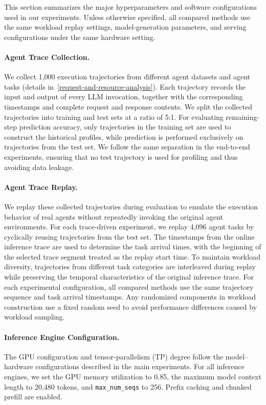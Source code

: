 This section summarizes the major hyperparameters and software configurations used in our experiments. Unless otherwise specified, all compared methods use the same workload replay settings, model-generation parameters, and serving configurations under the same hardware setting.

\paragraph{Agent Trace Collection.}
We collect 1,000 execution trajectories from different agent datasets and agent tasks (details in~\autoref{request-and-resource-analysis}). Each trajectory records the input and output of every LLM invocation, together with the corresponding timestamps and complete request and response contents. We split the collected trajectories into training and test sets at a ratio of 5:1. For evaluating remaining-step prediction accuracy, only trajectories in the training set are used to construct the historical profiles, while prediction is performed exclusively on trajectories from the test set. We follow the same separation in the end-to-end experiments, ensuring that no test trajectory is used for profiling and thus avoiding data leakage.

\paragraph{Agent Trace Replay.}
We replay these collected trajectories during evaluation to emulate the execution behavior of real agents without repeatedly invoking the original agent environments. For each trace-driven experiment, we replay 4,096 agent tasks by cyclically reusing trajectories from the test set. The timestamps from the online inference trace are used to determine the task arrival times, with the beginning of the selected trace segment treated as the replay start time. To maintain workload diversity, trajectories from different task categories are interleaved during replay while preserving the temporal characteristics of the original inference trace. For each experimental configuration, all compared methods use the same trajectory sequence and task arrival timestamps. Any randomized components in workload construction use a fixed random seed to avoid performance differences caused by workload sampling.

\paragraph{Inference Engine Configuration.}
The GPU configuration and tensor-parallelism (TP) degree follow the model--hardware configurations described in the main experiments. For all inference engines, we set the GPU memory utilization to 0.85, the maximum model context length to 20,480 tokens, and \texttt{max\_num\_seqs} to 256. Prefix caching and chunked prefill are enabled.

